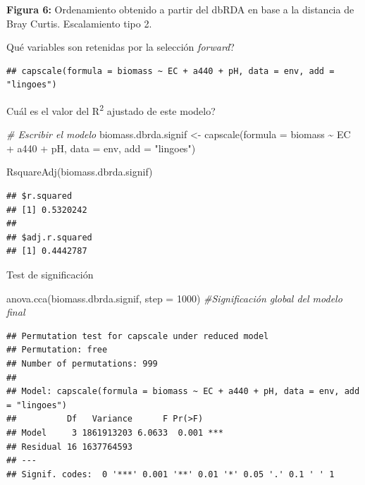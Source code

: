 \documentclass[
]{book}
\newenvironment{Shaded}{\begin{snugshade}}{\end{snugshade}}
\newcommand{\AttributeTok}[1]{\textcolor[rgb]{0.77,0.63,0.00}{#1}}
\newcommand{\CommentTok}[1]{\textcolor[rgb]{0.56,0.35,0.01}{\textit{#1}}}
\newcommand{\DecValTok}[1]{\textcolor[rgb]{0.00,0.00,0.81}{#1}}
\newcommand{\FunctionTok}[1]{\textcolor[rgb]{0.00,0.00,0.00}{#1}}
\newcommand{\NormalTok}[1]{#1}
\newcommand{\OtherTok}[1]{\textcolor[rgb]{0.56,0.35,0.01}{#1}}
\newcommand{\SpecialCharTok}[1]{\textcolor[rgb]{0.00,0.00,0.00}{#1}}
\newcommand{\StringTok}[1]{\textcolor[rgb]{0.31,0.60,0.02}{#1}}
\begin{document}
\textbf{Figura 6:} Ordenamiento obtenido a partir del dbRDA en base a la distancia de Bray Curtis. Escalamiento tipo 2.

Qué variables son retenidas por la selección \emph{forward}?

\begin{Shaded}
\end{Shaded}

\begin{verbatim}
## capscale(formula = biomass ~ EC + a440 + pH, data = env, add = "lingoes")
\end{verbatim}

Cuál es el valor del R\textsuperscript{2} ajustado de este modelo?

\begin{Shaded}
\begin{Highlighting}[]
\CommentTok{\# Escribir el modelo}
\NormalTok{biomass.dbrda.signif }\OtherTok{\textless{}{-}} \FunctionTok{capscale}\NormalTok{(}\AttributeTok{formula =}\NormalTok{ biomass }\SpecialCharTok{\textasciitilde{}}\NormalTok{ EC }\SpecialCharTok{+}\NormalTok{ a440 }\SpecialCharTok{+}\NormalTok{ pH, }\AttributeTok{data =}\NormalTok{ env, }\AttributeTok{add =} \StringTok{"lingoes"}\NormalTok{)}

\FunctionTok{RsquareAdj}\NormalTok{(biomass.dbrda.signif)}
\end{Highlighting}
\end{Shaded}

\begin{verbatim}
## $r.squared
## [1] 0.5320242
## 
## $adj.r.squared
## [1] 0.4442787
\end{verbatim}

Test de significación

\begin{Shaded}
\begin{Highlighting}[]
\FunctionTok{anova.cca}\NormalTok{(biomass.dbrda.signif, }\AttributeTok{step =} \DecValTok{1000}\NormalTok{) }\CommentTok{\#Significación global del modelo final}
\end{Highlighting}
\end{Shaded}

\begin{verbatim}
## Permutation test for capscale under reduced model
## Permutation: free
## Number of permutations: 999
## 
## Model: capscale(formula = biomass ~ EC + a440 + pH, data = env, add = "lingoes")
##          Df   Variance      F Pr(>F)    
## Model     3 1861913203 6.0633  0.001 ***
## Residual 16 1637764593                  
## ---
## Signif. codes:  0 '***' 0.001 '**' 0.01 '*' 0.05 '.' 0.1 ' ' 1
\end{verbatim}
\end{document}
